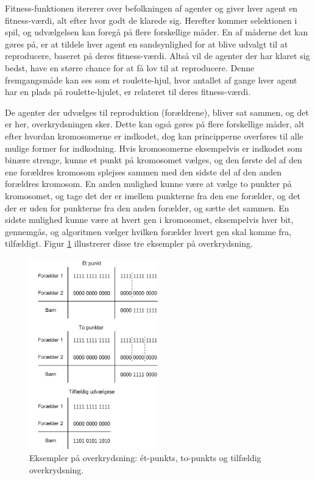 Fitness-funktionen itererer over befolkningen af agenter og giver hver agent en fitness-værdi, alt efter hvor godt de klarede sig. Herefter kommer selektionen i spil, og udvælgelsen kan foregå på flere forskellige måder. En af måderne det kan gøres på, er at tildele hver agent en sandsynlighed for at blive udvalgt til at reproducere, baseret på deres fitness-værdi. Altså vil de agenter der har klaret sig bedst, have en større chance for at få lov til at reproducere. Denne fremgangsmåde kan ses som et roulette-hjul, hvor antallet af gange hver agent har en plads på roulette-hjulet, er relateret til deres fitness-værdi.
\par
De agenter der udvælges til reproduktion (forældrene), bliver sat sammen, og det er her, overkrydsningen sker. Dette kan også gøres på flere forskellige måder, alt efter hvordan kromosomerne er indkodet, dog kan principperne overføres til alle mulige former for indkodning. Hvis kromosomerne eksempelvis er indkodet som binære strenge, kunne et punkt på kromosomet vælges, og den første del af den ene forældres kromosom splejses sammen med den sidste del af den anden forældres kromosom. En anden mulighed kunne være at vælge to punkter på kromosomet, og tage det der er imellem punkterne fra den ene forælder, og det der er uden for punkterne fra den anden forælder, og sætte det sammen. En sidste mulighed kunne være at hvert gen i kromosomet, eksempelvis hver bit, gennemgås, og algoritmen vælger hvilken forælder hvert gen skal komme fra, tilfældigt. Figur \ref{Overkrydsning} illustrerer disse tre eksempler på overkrydsning.
\begin{figure}[H]
    \centering
    \includegraphics[width=0.5\textwidth]{figures/Overkrydsning.png}
    \caption{Eksempler på overkrydsning: ét-punkts, to-punkts og tilfældig overkrydsning.}
    \label{Overkrydsning}
\end{figure}

